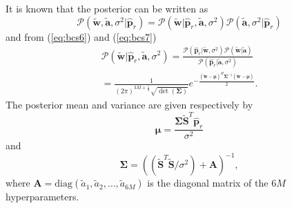 \documentclass[10pt,final]{IEEEtran}
\begin{document}
It is known that the posterior can be written as
\begin{equation}\label{eq:bcs10}
 \mathcal{P}(\tilde{\textbf{w}},\tilde{\textbf{a}},\sigma^{2}|\hat{\textbf{p}}_{r})=\mathcal{P}(\tilde{\textbf{w}}|\hat{\textbf{p}}_{r},\tilde{\textbf{a}},\sigma^{2})\mathcal{P}(\tilde{\textbf{a}},\sigma^{2}|\hat{\textbf{p}}_{r})
\end{equation}
and from (\ref{eq:bcs6}) and (\ref{eq:bcs7})
\begin{eqnarray}\label{eq:bcs11}\nonumber
  \mathcal{P}(\tilde{\textbf{w}}|\hat{\textbf{p}}_{r},\tilde{\textbf{a}},\sigma^{2}) = \frac{\mathcal{P}(\hat{\textbf{p}}_{r}|\tilde{\textbf{w}},\sigma^{2})\mathcal{P}(\tilde{\textbf{w}}|\tilde{\textbf{a}})}{\mathcal{P}(\hat{\textbf{p}}_{r}|\tilde{\textbf{a}},\sigma^{2})}\\
 = \frac{1}{(2\pi)^{3M+\frac{1}{2}}\sqrt{\det(\boldsymbol\Sigma)}}e^{-\frac{(\tilde{\textbf{w}}-\boldsymbol\mu)^{H}\boldsymbol\Sigma^{-1}(\tilde{\textbf{w}}-\boldsymbol\mu)}{2}}.
\end{eqnarray}
The posterior mean and variance are given respectively by
\begin{equation}\label{eq:bcs12}
  \boldsymbol\mu=\frac{\boldsymbol\Sigma\tilde{\textbf{S}}^{T}\hat{\textbf{p}}_{r}}{\sigma^{2}}
\end{equation}
and
\begin{equation}\label{eq:bcs13}
  \boldsymbol\Sigma=((\tilde{\textbf{S}}^{T}\tilde{\textbf{S}}/\sigma^{2})+\textbf{A})^{-1},
\end{equation}
where $\textbf{A}=\text{diag}(\tilde{a}_{1}, \tilde{a}_{2}, \ldots, \tilde{a}_{6M})$ is the diagonal matrix of the $6M$ hyperparameters.
\end{document}

